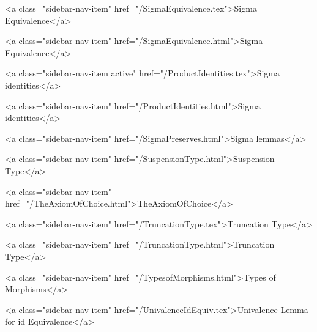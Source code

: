       
    
      
        
          <a class="sidebar-nav-item" href="/SigmaEquivalence.tex">Sigma Equivalence</a>
        
      
    
      
        
          <a class="sidebar-nav-item" href="/SigmaEquivalence.html">Sigma Equivalence</a>
        
      
    
      
        
          <a class="sidebar-nav-item active" href="/ProductIdentities.tex">Sigma identities</a>
        
      
    
      
        
          <a class="sidebar-nav-item" href="/ProductIdentities.html">Sigma identities</a>
        
      
    
      
        
          <a class="sidebar-nav-item" href="/SigmaPreserves.html">Sigma lemmas</a>
        
      
    
      
        
          <a class="sidebar-nav-item" href="/SuspensionType.html">Suspension Type</a>
        
      
    
      
        
          <a class="sidebar-nav-item" href="/TheAxiomOfChoice.html">TheAxiomOfChoice</a>
        
      
    
      
        
          <a class="sidebar-nav-item" href="/TruncationType.tex">Truncation Type</a>
        
      
    
      
        
          <a class="sidebar-nav-item" href="/TruncationType.html">Truncation Type</a>
        
      
    
      
        
          <a class="sidebar-nav-item" href="/TypesofMorphisms.html">Types of Morphisms</a>
        
      
    
      
        
          <a class="sidebar-nav-item" href="/UnivalenceIdEquiv.tex">Univalence Lemma for id Equivalence</a>
        
